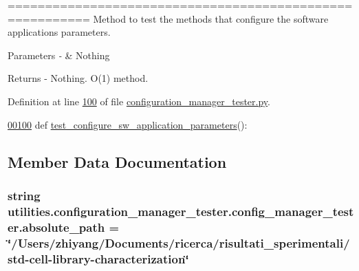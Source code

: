 ========================================================= Method to test the methods that configure the software application\textquotesingle{}s parameters. 


\begin{DoxyParams}{Parameters}
{\em -\/} & Nothing \\
\hline
\end{DoxyParams}
\begin{DoxyReturn}{Returns}
-\/ Nothing. O(1) method. 
\end{DoxyReturn}


Definition at line \hyperlink{configuration__manager__tester_8py_source_l00100}{100} of file \hyperlink{configuration__manager__tester_8py_source}{configuration\+\_\+manager\+\_\+tester.\+py}.


\begin{DoxyCode}
\hypertarget{classutilities_1_1configuration__manager__tester_1_1config__manager__tester_l00100}{}\hyperlink{classutilities_1_1configuration__manager__tester_1_1config__manager__tester_a1f30cbc427332b33d4e4a8e32ae3b980}{00100}     \textcolor{keyword}{def }\hyperlink{classutilities_1_1configuration__manager__tester_1_1config__manager__tester_a1f30cbc427332b33d4e4a8e32ae3b980}{test\_configure\_sw\_application\_parameters}():
\end{DoxyCode}


\subsection{Member Data Documentation}
\hypertarget{classutilities_1_1configuration__manager__tester_1_1config__manager__tester_aa23d0c5b64043e706aa32519034a37e8}{}
\subsubsection[{absolute\+\_\+path}]{\setlength{\rightskip}{0pt plus 5cm}string utilities.\+configuration\+\_\+manager\+\_\+tester.\+config\+\_\+manager\+\_\+tester.\+absolute\+\_\+path = \char`\"{}/Users/zhiyang/Documents/ricerca/risultati\+\_\+sperimentali/std-\/cell-\/library-\/characterization\char`\"{}\hspace{0.3cm}{\ttfamily [static]}}\label{classutilities_1_1configuration__manager__tester_1_1config__manager__tester_aa23d0c5b64043e706aa32519034a37e8}


